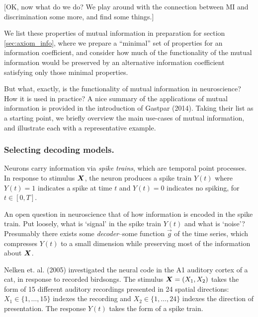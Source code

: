 [OK, now what do we do?  We play around with the connection between MI
  and discrimination some more, and find some things.]

We list these properties of mutual information in preparation for
section \ref{sec:axiom_info}, where we prepare a ``minimal'' set of
properties for an information coefficient, and consider how much of
the functionality of the mutual information would be preserved by an
alternative information coefficient satisfying only those minimal
properties.

But what, exactly, is the functionality of mutual information in
neuroscience?  How it is used in practice?  A nice summary of the
applications of mutual information is provided in the introduction of
Gastpar (2014).  Taking their list as a starting point, we briefly
overview the main use-cases of mutual information, and illustrate each
with a representative example.

\subsubsection{Selecting decoding models.}
Neurons carry information via \emph{spike trains}, which are temporal
point processes.  In response to stimulus $\boldsymbol{X}$, the neuron produces a
spike train $Y(t)$ where $Y(t) = 1$ indicates a spike at time $t$ and
$Y(t) = 0$ indicates no spiking, for $t \in [0, T]$.

An open question in neuroscience that of how information is encoded in
the spike train.  Put loosely, what is `signal' in the spike train
$Y(t)$ and what is `noise'?  Presumably there exists
some \emph{decoder}--some function $\vec{g}$ of the time series, which
compresses $Y(t)$ to a small dimension while preserving most of the
information about $\boldsymbol{X}$.

Nelken et. al. (2005) investigated the neural code in the A1 auditory
cortex of a cat, in response to recorded birdsongs.  The stimulus $\boldsymbol{X}
= (X_1, X_2)$ takes the form of 15 different auditory recordings
presented in 24 spatial directions: $X_1 \in \{1,\hdots, 15\}$ indexes
the recording and $X_2 \in \{1,\hdots, 24\}$ indexes the direction of
presentation.  The response $Y(t)$ takes the form of a spike train.


